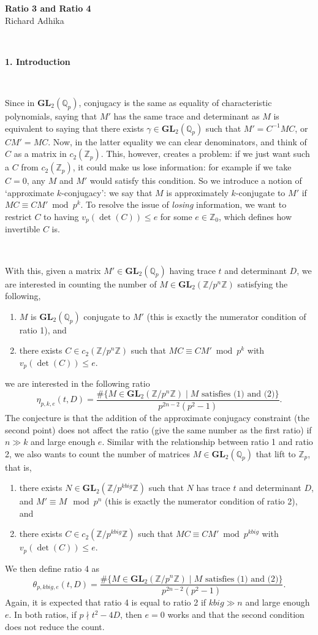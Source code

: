 \documentclass[letterpaper,12pt]{article}
\newcommand{\Z}{\mathbb{Z}}
\newcommand{\Q}{\mathbb{Q}}
\newcommand{\GL}{\mathbf {GL}}
\begin{document}
\begin{center}
    {\bf \Huge Ratio 3 and Ratio 4} \\
    Richard Adhika
\end{center}

\

{\bf \LARGE 1. Introduction}

\

Since in $\GL_2(\Q_p)$, conjugacy is the same as equality of characteristic polynomials, saying that $M'$ has the same trace and determinant as $M$ is equivalent to saying that there exists $\gamma\in \GL_2(\Q_p)$ such that 
$M'=C^{-1}MC$, or $C M'=MC$.  
Now, in the latter equality we can clear denominators, and think of $C$ as a matrix in $c_2(\Z_p)$. This, however, creates a problem: 
if we just want such a $C$ from $c_2(\Z_p)$, it could make us lose information: for example if we take $C=0$, any $M$ and $M'$ would satisfy this condition. 
So we introduce a notion of `approximate $k$-conjugacy': 
we say that $M$ is approximately $k$-conjugate to $M'$ if 
$MC  \equiv C M'\bmod p^k$.
To resolve the issue of \emph{losing} information, we want to restrict $C$ to having 
$v_p(\det(C)) \leq e$ for some $e \in \Z_0$, which defines how invertible $C$ is.

\

With this, given a matrix $M' \in \GL_2(\Q_p)$ having trace $t$ and determinant $D$,
we are interested in counting the number of $M \in \GL_2(\Z / p^n\Z)$ satisfying the following,
\begin{enumerate}
\item $M$ is $\GL_2(\Q_p)$ conjugate to $M'$ (this is exactly the numerator condition of ratio 1), and
\item there exists $C \in c_2(\Z/p^n\Z)$ such that $MC \equiv C M' \bmod p^k$ with $v_p(\det(C)) \leq e$.
\end{enumerate} 
we are interested in the following ratio
\[
\eta_{p, k, e}(t, D) = 
\frac{\#\{M \in \GL_2(\Z / p^n\Z) \; | \; M \text{ satisfies (1) and (2)} \}}{p^{2n-2}(p^2-1)}.
\]
The conjecture is that the addition of the approximate conjugacy constraint (the second point) does not affect
the ratio (give the same number as the first ratio) if $n \gg k$ and large enough $e$.
Similar with the relationship between ratio 1 and ratio 2,
we also wants to count the number of matrices $M \in \GL_2(\Q_p) $ that lift to $\Z_p$, that is, 
\begin{enumerate}
\item there exists $N \in \GL_2(\Z/p^{kbig}\Z)$ such that $N$ has trace $t$ and determinant $D$, and $M' \equiv M \mod p^n$  (this is exactly the numerator condition of ratio 2), and
\item there exists $C \in c_2(\Z/p^{kbig}\Z)$ such that $MC \equiv C M' \bmod p^{kbig}$ with $v_p(\det(C)) \leq e$.
\end{enumerate} 
We then define ratio 4 as 
\[
\theta_{p, kbig, e}(t, D) = 
\frac{\#\{M \in \GL_2(\Z / p^n\Z) \; | \; M \text{ satisfies (1) and (2)} \}}{p^{2n-2}(p^2-1)}.
\]
Again, it is expected that ratio 4 is equal to ratio 2 if $kbig \gg n$ and large enough $e$.
In both ratios, if $p \nmid t^2-4D$, then $e=0$ works and that 
the second condition does not reduce the count.
\end{document}
